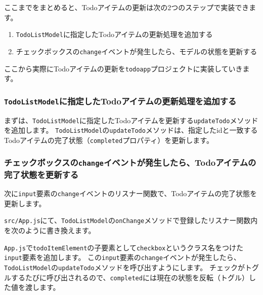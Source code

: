 ここまでをまとめると、Todoアイテムの更新は次の2つのステップで実装できます。

\begin{enumerate}
\def\labelenumi{\arabic{enumi}.}
\item
  \texttt{TodoListModel}に指定したTodoアイテムの更新処理を追加する
\item
  チェックボックスの\texttt{change}イベントが発生したら、モデルの状態を更新する
\end{enumerate}

ここから実際にTodoアイテムの更新を\texttt{todoapp}プロジェクトに実装していきます。

\hypertarget{TodoListModel-updateTodo}{%
\subsubsection{\texorpdfstring{\texttt{TodoListModel}に指定したTodoアイテムの更新処理を追加する}{TodoListModelに指定したTodoアイテムの更新処理を追加する}}\label{TodoListModel-updateTodo}}

まずは、\texttt{TodoListModel}に指定したTodoアイテムを更新する\texttt{updateTodo}メソッドを追加します。
\texttt{TodoListModel}の\texttt{updateTodo}メソッドは、指定したidと一致するTodoアイテムの完了状態（\texttt{completed}プロパティ）を更新します。



\hypertarget{onChange-update-model}{%
\subsubsection{\texorpdfstring{チェックボックスの\texttt{change}イベントが発生したら、Todoアイテムの完了状態を更新する}{チェックボックスのchangeイベントが発生したら、Todoアイテムの完了状態を更新する}}\label{onChange-update-model}}

次に\texttt{input}要素の\texttt{change}イベントのリスナー関数で、Todoアイテムの完了状態を更新します。

\texttt{src/App.js}にて、\texttt{TodoListModel}の\texttt{onChange}メソッドで登録したリスナー関数内を次のように書き換えます。

\texttt{App.js}で\texttt{todoItemElement}の子要素として\texttt{checkbox}というクラス名をつけた\texttt{input}要素を追加します。
この\texttt{input}要素の\texttt{change}イベントが発生したら、\texttt{TodoListModel}の\texttt{updateTodo}メソッドを呼び出すようにします。
チェックがトグルするたびに呼び出されるので、\texttt{completed}には現在の状態を反転（トグル）した値を渡します。

